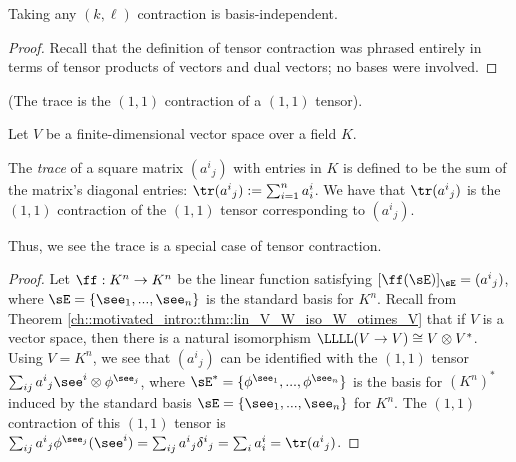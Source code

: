 \begin{theorem}
    Taking any $(k, \ell)$ contraction is basis-independent.
\end{theorem}

\begin{proof}
    Recall that the definition of tensor contraction was phrased entirely in terms of tensor products of vectors and dual vectors; no bases were involved.
\end{proof}

\begin{theorem}
    (The trace is the $(1, 1)$ contraction of a $(1, 1)$ tensor).
    
    Let $V$ be a finite-dimensional vector space over a field $K$.
    
    The \textit{trace} of a square matrix $(a^i{}_j)$ with entries in $K$ is defined to be the sum of the matrix's diagonal entries: $\tr(a^i{}_j) := \sum_{i = 1}^n a^i_i$. We have that $\tr(a^i{}_j)$ is the $(1, 1)$ contraction of the $(1, 1)$ tensor corresponding to $(a^i{}_j)$.
    
    Thus, we see the trace is a special case of tensor contraction.
\end{theorem}

\begin{proof}
    Let $\ff:K^n \rightarrow K^n$ be the linear function satisfying $[\ff(\sE)]_\sE = (a^i{}_j)$, where $\sE = \{\see_1, ..., \see_n\}$ is the standard basis for $K^n$. Recall from Theorem \ref{ch::motivated_intro::thm::lin_V_W_iso_W_otimes_V} that if $V$ is a vector space, then there is a natural isomorphism $\LLLL(V \rightarrow V) \cong V \otimes V^*$. Using $V = K^n$, we see that $(a^i{}_j)$ can be identified with the $(1, 1)$ tensor $\sum_{ij} a^i{}_j \see^i \otimes \phi^{\see_j}$, where $\sE^* = \{\phi^{\see_1}, ..., \phi^{\see_n}\}$ is the basis for $(K^n)^*$ induced by the standard basis $\sE = \{\see_1, ..., \see_n\}$ for $K^n$. The $(1, 1)$ contraction of this $(1, 1)$ tensor is $\sum_{ij} a^i{}_j \phi^{\see_j}(\see^i) = \sum_{ij} a^i{}_j \delta^i{}_j = \sum_i a^i_i = \tr(a^i{}_j)$. 
\end{proof}
